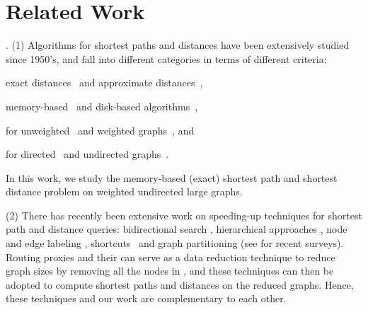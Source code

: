 \section{Related Work}
\label{sec-related}

.
(1) Algorithms for shortest  paths and distances have been extensively studied since 1950's, and fall into different categories
 in terms of different criteria:

 \bi
 \item exact distances~\cite{WuXDCZZ12,Dijkstra59,FredmanT84,LubyR89,GeisbergerSSD08,SankaranarayananSA09,SandersS05,GoldbergH05,MozesS12,ChengKCC12,MozesS12,ChanL07,SaundersT07,WagnerW07,bast2014route,delling2014robust,arz2013transit}
     and approximate distances~\cite{PotamiasBCG09,SarmaGNP10,ThorupZ05,SankaranarayananS10},


 \item memory-based~\cite{PotamiasBCG09,SarmaGNP10,WuXDCZZ12,Dijkstra59,FredmanT84,LubyR89,GeisbergerSSD08,Wei10,SankaranarayananSA09,SandersS05,
ThorupZ05,MozesS12,SaundersT07,WagnerW07,bast2014route,delling2014robust,arz2013transit,SankaranarayananS10} and disk-based algorithms~\cite{ChengKCC12,ChanL07},


 \item for unweighted~\cite{PotamiasBCG09,SarmaGNP10,Wei10,bast2014route,delling2014robust,arz2013transit} and weighted graphs~\cite{WuXDCZZ12,Dijkstra59,FredmanT84,LubyR89,GeisbergerSSD08,SankaranarayananSA09,GoldbergH05,MozesS12,SandersS05,ChengKCC12,ThorupZ05,MozesS12,ChanL07,SaundersT07,WagnerW07,bast2014route,delling2014robust,arz2013transit,SankaranarayananS10},
     and


 \item for directed~\cite{SaundersT07,GoldbergH05,MozesS12,bast2014route,delling2014robust,arz2013transit} and undirected graphs~\cite{PotamiasBCG09,SarmaGNP10,WuXDCZZ12,Dijkstra59,FredmanT84,LubyR89,GeisbergerSSD08,Wei10,SankaranarayananSA09,SandersS05,ChengKCC12,ThorupZ05,MozesS12,ChanL07,WagnerW07,bast2014route,delling2014robust,arz2013transit,SankaranarayananS10}.
 \ei


In this work, we study the memory-based (exact)  shortest path and shortest distance problem on weighted undirected large graphs.


\stab(2) There has recently been extensive work on speeding-up techniques for shortest  path and distance queries: bidirectional search \cite{LubyR89},
hierarchical approaches \cite{GeisbergerSSD08, arz2013transit}, node and edge labeling \cite{MohringSSWW05,SankaranarayananSA09}, shortcuts~\cite{SandersS05} and graph partitioning \cite{kl70,Karypis98,YangYZK12, delling2011graph} (see \cite{WuXDCZZ12,WagnerW07, bast2014route,delling2014robust} for recent surveys). Routing proxies and their \dras can serve as a data reduction technique to reduce graph sizes by removing all the nodes in \dras, and these techniques can then be adopted to compute shortest paths and distances on the reduced graphs. Hence, these techniques and our work are complementary to each other.


